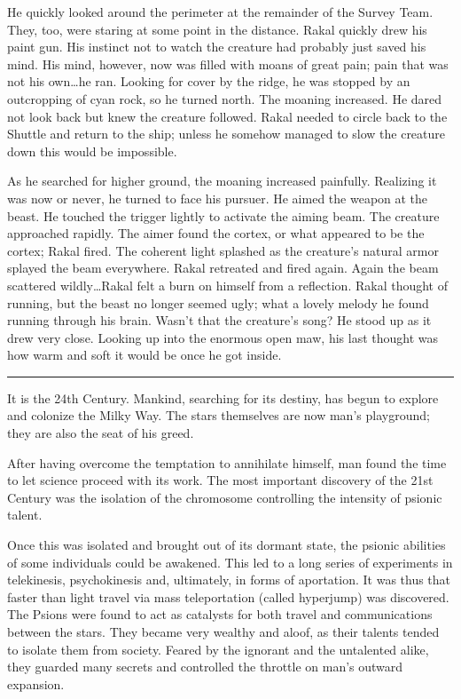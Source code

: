 He quickly looked around the perimeter at the remainder of the Survey
Team.  They, too, were staring at some point in the distance.  Rakal
quickly drew his paint gun.  His instinct not to watch the creature
had probably just saved his mind.  His mind, however, now was filled
with moans of great pain; pain that was not his own\ldots he ran.
Looking for cover by the ridge, he was stopped by an outcropping of
cyan rock, so he turned north.  The moaning increased.  He dared not
look back but knew the creature followed.  Rakal needed to circle back
to the Shuttle and return to the ship; unless he somehow managed to
slow the creature down this would be impossible.

As he searched for higher ground, the moaning increased painfully.
Realizing it was now or never, he turned to face his pursuer.  He
aimed the weapon at the beast.  He touched the trigger lightly to
activate the aiming beam.  The creature approached rapidly.  The aimer
found the cortex, or what appeared to be the cortex; Rakal fired.  The
coherent light splashed as the creature's natural armor splayed the
beam everywhere.  Rakal retreated and fired again.  Again the beam
scattered wildly\ldots Rakal felt a burn on himself from a reflection.
Rakal thought of running, but the beast no longer seemed ugly; what a
lovely melody he found running through his brain.  Wasn't that the
creature's song? He stood up as it drew very close.  Looking up into
the enormous open maw, his last thought was how warm and soft it would
be once he got inside.

\bigskip

\begin{center}
  \rule{8cm}{0.5mm}
\end{center}

\bigskip

It is the 24th Century.  Mankind, searching for its destiny, has begun
to explore and colonize the Milky Way.  The stars themselves are now
man's playground; they are also the seat of his greed.

After having overcome the temptation to annihilate himself, man found
the time to let science proceed with its work.  The most important
discovery of the 21st Century was the isolation of the chromosome
controlling the intensity of psionic talent.

Once this was isolated and brought out of its dormant state, the
psionic abilities of some individuals could be awakened.  This led to
a long series of experiments in telekinesis, psychokinesis and,
ultimately, in forms of aportation.  It was thus that faster than
light travel via mass teleportation (called hyperjump) was discovered.
The Psions were found to act as catalysts for both travel and
communications between the stars.  They became very wealthy and aloof,
as their talents tended to isolate them from society.  Feared by the
ignorant and the untalented alike, they guarded many secrets and
controlled the throttle on man's outward expansion.

